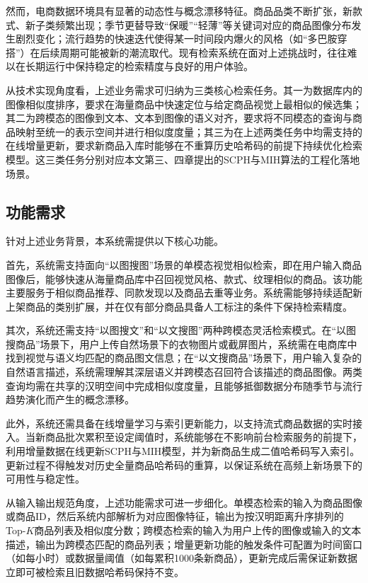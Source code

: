 然而，电商数据环境具有显著的动态性与概念漂移特征。商品品类不断扩张，新款式、新子类频繁出现；季节更替导致“保暖”“轻薄”等关键词对应的商品图像分布发生剧烈变化；流行趋势的快速迭代使得某一时间段内爆火的风格（如“多巴胺穿搭”）在后续周期可能被新的潮流取代。现有检索系统在面对上述挑战时，往往难以在长期运行中保持稳定的检索精度与良好的用户体验。

从技术实现角度看，上述业务需求可归纳为三类核心检索任务。其一为数据库内的图像相似度排序，要求在海量商品中快速定位与给定商品视觉上最相似的候选集；其二为跨模态的图像到文本、文本到图像的语义对齐，要求将不同模态的查询与商品映射至统一的表示空间并进行相似度度量；其三为在上述两类任务中均需支持的在线增量更新，要求新商品入库时能够在不重算历史哈希码的前提下持续优化检索模型。这三类任务分别对应本文第三、四章提出的SCPH与MIH算法的工程化落地场景。

\subsection{功能需求}
针对上述业务背景，本系统需提供以下核心功能。

首先，系统需支持面向“以图搜图”场景的单模态视觉相似检索，即在用户输入商品图像后，能够快速从海量商品库中召回视觉风格、款式、纹理相似的商品。该功能主要服务于相似商品推荐、同款发现以及商品去重等业务。系统需能够持续适配新上架商品的类别扩展，并在仅有部分商品具备人工标注的条件下保持检索精度。

其次，系统还需支持“以图搜文”和“以文搜图”两种跨模态灵活检索模式。在“以图搜商品”场景下，用户上传自然场景下的衣物图片或截屏图片，系统需在电商库中找到视觉与语义均匹配的商品图文信息；在“以文搜商品”场景下，用户输入复杂的自然语言描述，系统需理解其深层语义并跨模态召回符合该描述的商品图像。两类查询均需在共享的汉明空间中完成相似度度量，且能够抵御数据分布随季节与流行趋势演化而产生的概念漂移。

此外，系统还需具备在线增量学习与索引更新能力，以支持流式商品数据的实时接入。当新商品批次累积至设定阈值时，系统能够在不影响前台检索服务的前提下，利用增量数据在线更新SCPH与MIH模型，并为新商品生成二值哈希码写入索引。更新过程不得触发对历史全量商品哈希码的重算，以保证系统在高频上新场景下的可用性与稳定性。

从输入输出规范角度，上述功能需求可进一步细化。单模态检索的输入为商品图像或商品ID，然后系统内部解析为对应图像特征，输出为按汉明距离升序排列的Top-$K$商品列表及相似度分数；跨模态检索的输入为用户上传的图像或输入的文本描述，输出为跨模态匹配的商品列表；增量更新功能的触发条件可配置为时间窗口（如每小时）或数据量阈值（如每累积1000条新商品），更新完成后需保证新数据立即可被检索且旧数据哈希码保持不变。

